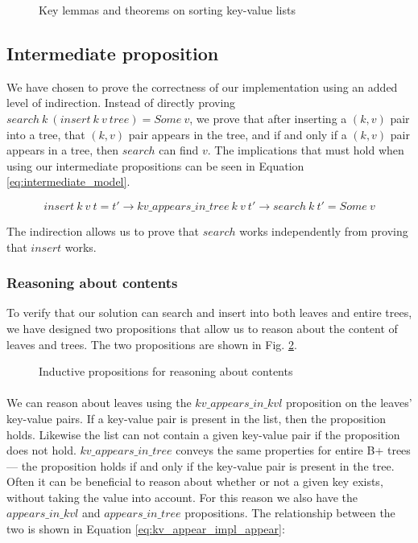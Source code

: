 \begin{figure}
  
  \caption{Key lemmas and theorems on sorting key-value lists}
  \label{fig:key_sorting_lemmas}
\end{figure}

\subsection{Intermediate proposition}
\label{intermediate_prop}
We have chosen to prove the correctness of our implementation using an added level of indirection. Instead of directly proving $search~k~(insert~k~v~ tree) = Some~v$, we prove that after inserting a $(k, v)$ pair into a tree,
that $(k, v)$ pair appears in the tree, and if and only if a $(k, v)$ pair appears in a tree, then $search$ can find $v$. The implications that must hold when using our intermediate propositions can be seen in Equation \ref{eq:intermediate_model}.

\begin{equation}
  insert~k~v~t = t' \rightarrow kv\_appears\_in\_tree~k~v~t' \rightarrow search~k~t' = Some~v
  \label{eq:intermediate_model}
\end{equation}

The indirection allows us to prove that $search$ works independently from proving that $insert$ works.

\subsubsection{Reasoning about contents}
To verify that our solution can search and insert into both leaves and entire trees, we have designed two propositions that allow us to reason about the content of leaves and trees. The two propositions are shown in Fig. \ref{fig:aik_and_ait}. 

\begin{figure}
  
  \caption{Inductive propositions for reasoning about contents}
  \label{fig:aik_and_ait}
\end{figure}

\paragraph{}
We can reason about leaves using the $kv\_appears\_in\_kvl$ proposition on the leaves' key-value pairs. If a key-value pair is present in the list, then the proposition holds. Likewise the list can not contain a given key-value pair if the proposition does not hold. $kv\_appears\_in\_tree$ conveys the same properties for entire B+ trees --- the proposition holds if and only if the key-value pair is present in the tree. Often it can be beneficial to reason about whether or not a given key exists, without taking the value into account. For this reason we also have the $appears\_in\_kvl$ and $appears\_in\_tree$ propositions. The relationship between the two is shown in Equation \ref{eq:kv_appear_impl_appear}: 

